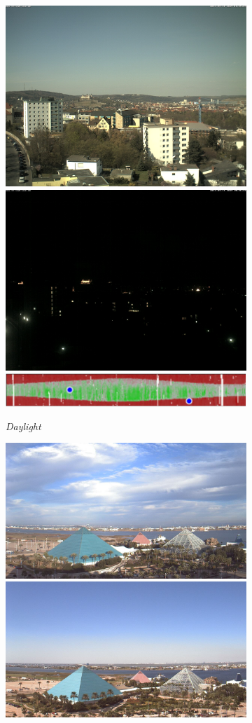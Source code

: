 \documentclass[10pt,twocolumn,letterpaper]{article}
\begin{document}
\begin{figure}
	\centering
  \begin{subfigure}[b]{\columnwidth}
    \centering
		\includegraphics[width=0.49\columnwidth]{figs/cam_summary/3396_04180908.jpg}
		\includegraphics[width=0.49\columnwidth]{figs/cam_summary/3396_09151838.jpg}
		\includegraphics[width=\columnwidth]{figs/cam_summary/00003396_daylight.pdf}
    \caption{\emph{Daylight}}
    \label{fig:daylight}
	\end{subfigure}	
  \begin{subfigure}[b]{\columnwidth}
    \centering
		\includegraphics[width=0.49\columnwidth]{figs/cam_summary/623_01191411.jpg}
		\includegraphics[width=0.49\columnwidth]{figs/cam_summary/623_10071911.jpg}

\end{subfigure}
\end{figure}
\end{document}
